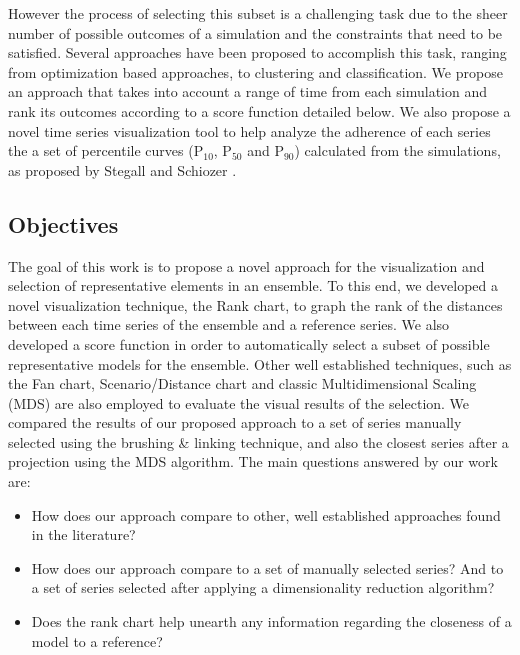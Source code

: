 \documentclass[final,5p,times,twocolumn]{elsarticle}
\begin{document}
However the process of selecting this subset is a challenging task due to the sheer number of possible outcomes of a simulation and the constraints that need to be satisfied. Several approaches have been proposed to accomplish this task, ranging from optimization based approaches, to clustering and classification. We propose an approach that takes into account a range of time from each simulation and rank its outcomes according to a score function detailed below. We also propose a novel time series visualization tool to help analyze the adherence of each series the a set of percentile curves (P$_{10}$, P$_{50}$ and P$_{90}$) calculated from the simulations, as proposed by Stegall and Schiozer \cite{steagall:2001}.



\subsection{Objectives}
The goal of this work is to propose a novel approach for the visualization and selection of representative elements in an ensemble. To this end, we developed a novel visualization technique, the Rank chart, to graph the rank of the distances between each time series of the ensemble and a reference series. We also developed a score function in order to automatically select a subset of possible representative models for the ensemble. Other well established techniques, such as the Fan chart, Scenario/Distance chart and classic Multidimensional Scaling (MDS) are also employed to evaluate the visual results of the selection. We compared the results of our proposed approach to a set of series manually selected using the brushing \& linking technique, and also the closest series after a projection using the MDS algorithm. The main questions answered by our work are:

\begin{itemize}
  \item How does our approach compare to other, well established approaches found in the literature?
  \item How does our approach compare to a set of manually selected series? And to a set of series selected after applying a dimensionality reduction algorithm?
  \item Does the rank chart help unearth any information regarding the closeness of a model to a reference?
\end{itemize}
\end{document}
